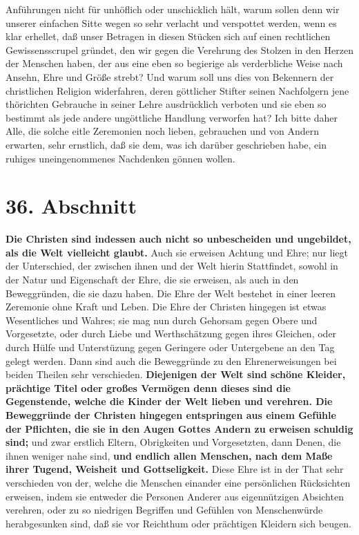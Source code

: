 Anführungen nicht für unhöflich oder unschicklich hält, warum sollen denn wir
unserer einfachen Sitte wegen so sehr verlacht und verspottet werden, wenn es
klar erhellet, daß unser Betragen in diesen Stücken sich auf einen rechtlichen
Gewissensscrupel gründet, den wir gegen die Verehrung des Stolzen in den Herzen
der Menschen haben, der aus eine eben so begierige als verderbliche Weise nach
Ansehn, Ehre und Größe strebt? Und warum soll uns dies von Bekennern der
christlichen Religion widerfahren, deren göttlicher Stifter seinen Nachfolgern
jene thörichten Gebrauche in seiner Lehre ausdrücklich verboten und sie eben so
bestimmt als jede andere ungöttliche Handlung verworfen hat? Ich bitte daher
Alle, die solche eitle Zeremonien noch lieben, gebrauchen und von Andern
erwarten, sehr ernstlich, daß sie dem, was ich darüber geschrieben habe, ein
ruhiges uneingenommenes  Nachdenken gönnen wollen.

\section{36. Abschnitt} \label{kap9_ab36}

\textbf{Die Christen sind indessen auch nicht so unbescheiden und ungebildet, als die
Welt vielleicht glaubt.} Auch sie erweisen Achtung und Ehre; nur liegt der
Unterschied, der zwischen ihnen und der Welt hierin Stattfindet, sowohl in der
Natur und Eigenschaft der Ehre, die sie erweisen, als auch in den Beweggründen,
die sie dazu haben. Die Ehre der Welt bestehet in einer leeren Zeremonie ohne
Kraft und Leben. Die Ehre der Christen hingegen ist etwas Wesentliches und
Wahres; sie mag nun durch Gehorsam gegen Obere und Vorgesetzte, oder durch Liebe
und Werthschätzung gegen ihres Gleichen, oder durch Hülfe und Unterstüzung gegen
Geringere oder Untergebene an den Tag gelegt werden. Dann sind auch die
Beweggründe zu den Ehrenerweisungen bei beiden Theilen sehr verschieden.
\textbf{Diejenigen der Welt sind schöne Kleider, prächtige Titel oder großes Vermögen
denn dieses sind die Gegenstende, welche die Kinder der Welt lieben und
verehren. Die Beweggründe der Christen hingegen entspringen aus einem Gefühle
der Pflichten, die sie in den Augen Gottes Andern zu erweisen schuldig sind;} und
zwar erstlich Eltern, Obrigkeiten und Vorgesetzten, dann Denen, die ihnen
weniger nahe sind, \textbf{und endlich allen Menschen, nach dem Maße ihrer Tugend,
Weisheit und Gottseligkeit.} Diese Ehre ist in der That sehr verschieden von der,
welche die Menschen einander eine persönlichen Rücksichten erweisen, indem sie
entweder die Personen Anderer aus eigennützigen Absichten verehren, oder zu so
niedrigen Begriffen und Gefühlen von Menschenwürde herabgesunken sind, daß sie
vor Reichthum oder prächtigen Kleidern sich beugen.

